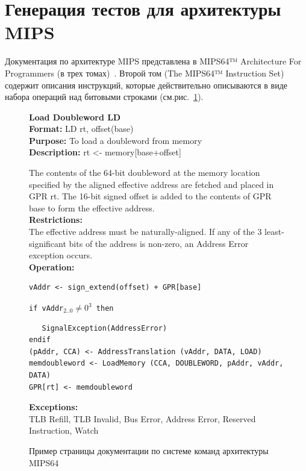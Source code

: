 \section{Генерация тестов для архитектуры MIPS}


Документация по архитектуре MIPS представлена в MIPS64™ Architecture For Programmers (в трех томах)~\cite{mips64II, mips64III}. Второй том (The MIPS64™ Instruction Set) содержит описания инструкций, которые действительно описываются в виде набора операций над битовыми строками (см.рис.~\ref{fig:mips64_page}).

\begin{figure}
\textbf{Load Doubleword    LD}\\

\textbf{Format:} LD rt, offset(base)\\

\textbf{Purpose:} To load a doubleword from memory\\

\textbf{Description:} rt <- memory[base+offset]

The contents of the 64-bit doubleword at the memory location specified by the aligned effective address are fetched and placed in GPR rt. The 16-bit signed offset is added to the contents of GPR base to form the effective address.\\

\textbf{Restrictions:}\\
The effective address must be naturally-aligned. If any of the 3 least-significant bits of the address is non-zero, an Address Error exception occurs.\\

\textbf{Operation:}
\begin{verbatim}
vAddr <- sign_extend(offset) + GPR[base]
\end{verbatim}
\texttt{if vAddr$_{2..0} \neq 0^3$ then}
\begin{verbatim}
   SignalException(AddressError)
endif
(pAddr, CCA) <- AddressTranslation (vAddr, DATA, LOAD)
memdoubleword <- LoadMemory (CCA, DOUBLEWORD, pAddr, vAddr, DATA)
GPR[rt] <- memdoubleword
\end{verbatim}

\textbf{Exceptions:}\\
TLB Refill, TLB Invalid, Bus Error, Address Error, Reserved Instruction, Watch

\caption{Пример страницы документации по системе команд архитектуры MIPS64}\label{fig:mips64_page}
\end{figure}

